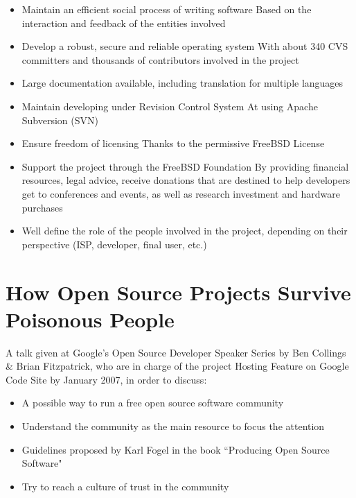 \documentclass[11pt]{article} %
\begin{document}
\begin{itemize}
  \item Maintain an efficient social process of writing software  
    Based on the interaction and feedback of the entities involved
  
  \item Develop a robust, secure and reliable operating system
    With about 340 CVS committers and thousands of contributors involved in the project
  
  \item Large documentation available, including translation for multiple languages
  
  \item Maintain developing under Revision Control System
	At using Apache Subversion (SVN)   
  
  \item Ensure freedom of licensing
	Thanks to the permissive FreeBSD License  

  \item Support the project through the FreeBSD Foundation
	By providing financial resources, legal advice, receive donations that are destined to help developers get to conferences and events, as well as research investment and hardware purchases
	
  \item Well define the role of the people involved in the project, depending on their perspective (ISP, developer, final user, etc.)
  
\end{itemize}


\section{How Open Source Projects Survive Poisonous People}


A talk given at Google's Open Source Developer Speaker Series by Ben Collings \& Brian Fitzpatrick, who are in charge of the project Hosting Feature on Google Code Site by January 2007, in order to discuss:

\begin{itemize}
  \item A possible way to run a free open source software community
  \item Understand the community as the main resource to focus the attention
  \item Guidelines proposed by Karl Fogel in the book ``Producing Open Source Software" \cite{Fogel:2005kf}
  \item Try to reach a culture of trust in the community
\end{itemize}
\end{document}

